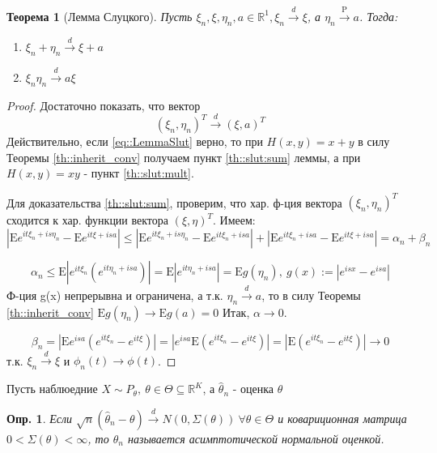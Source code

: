 \documentclass[12pt]{article}
\newtheorem{definition}{Опр.}
\theoremstyle{basic_theorem}
\theoremstyle{name_theorem}
\newtheorem*{named_theorem}{Теорема}
\def\R{
    \mathbb{R}
}
\def\E{
    \mathrm{E}
}
\def\P{
    \mathrm{P}
}
\begin{document}
\begin{named_theorem}[Лемма Слуцкого]
\label{th::slut}
    Пусть $\xi_n, \xi, \eta_n, a \in \R^1, \xi_n \xrightarrow{d} \xi$, а $\eta_n \xrightarrow{\P} a$.
    Тогда:
    \begin{enumerate}
        \item \label{th::slut:sum} $\xi_n + \eta_n \xrightarrow{d} \xi + a$
        \item \label{th::slut:mult} $\xi_n \eta_n \xrightarrow{d} a\xi$
    \end{enumerate}
\end{named_theorem}
\begin{proof}
    Достаточно показать, что вектор
    \begin{equation} \label{eq::LemmaSlut}
        (\xi_n, \eta_n)^T \xrightarrow{d} (\xi, a)^T 
    \end{equation}
    Действительно, если \eqref{eq::LemmaSlut} верно, то при $H(x, y) = x + y$ в силу Теоремы \ref{th::inherit_conv} получаем пункт \ref{th::slut:sum} леммы,
    а при $H(x, y) = xy$ -  пункт \ref{th::slut:mult}.

    Для доказательства \ref{th::slut:sum}, проверим, что хар. ф-ция
    вектора $(\xi_n, \eta_n)^T$ сходится к хар. функции вектора $(\xi, \eta)^T$.
    Имеем: 
    $$\left\lvert\E e^{it\xi_n + is\eta_n} - \E e^{it\xi + isa}\right\rvert \leq \left\lvert \E e^{it\xi_n + is\eta_n} - \E e^{it\xi_n + isa}\right\rvert + \left\lvert \E e^{it\xi_n + isa} - \E e^{it\xi + isa}\right\rvert = \alpha_n + \beta_n$$

    $$\alpha_n \leq \E \left\lvert e^{it\xi_n}(e^{it\eta_n + isa}) \right\rvert  = \E \left\lvert e^{it\eta_n + isa} \right\rvert  = \E g(\eta_n), \ g(x):= \left\lvert e^{isx} - e^{isa} \right\rvert $$
    Ф-ция g(x) непрерывна и ограничена, а т.к. $\eta_n \xrightarrow{d} a$,
    то в силу Теоремы \ref{th::inherit_conv} $\E g(\eta_n) \rightarrow \E g(a) = 0$
    Итак, $\alpha \rightarrow 0$.

    $$\beta_n = \left\lvert \E e^{isa}(e^{it\xi_n} - e^{it\xi}) \right\rvert  = \left\lvert e^{isa} \E (e^{it\xi_n} - e^{it\xi}) \right\rvert  = \left\lvert \E (e^{it\xi_n} - e^{it\xi}) \right\rvert  \rightarrow 0$$
    т.к. $\xi_n \xrightarrow{d} \xi$ и $\phi_n(t) \rightarrow \phi(t)$.
\end{proof}

Пусть наблюедние $X \sim  P_{\theta},\ \theta \in \Theta \subseteq \R^{K}$, а $\widehat{\theta}_n$ - оценка $\theta$

\begin{definition}
    Если $\sqrt{n}(\widehat{\theta}_n - \theta) \xrightarrow{d} N(0, \Sigma(\theta)) \ \forall \theta \in \Theta$
    и ковариционная матрица $0 < \Sigma(\theta) < \infty$, то $\widehat{\theta}_n$ называется асимптотической нормальной оценкой.
\end{definition}
\end{document}
